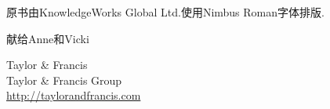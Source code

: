 原书由KnowledgeWorks Global Ltd.使用Nimbus Roman字体排版.
\endgroup
\clearpage
\vspace*{5cm}\begin{center}\Large 献给Anne和Vicki\end{center}
\vfill\begin{center}\small Taylor \& Francis\\Taylor \& Francis Group\\\url{http://taylorandfrancis.com}\end{center}\clearpage

